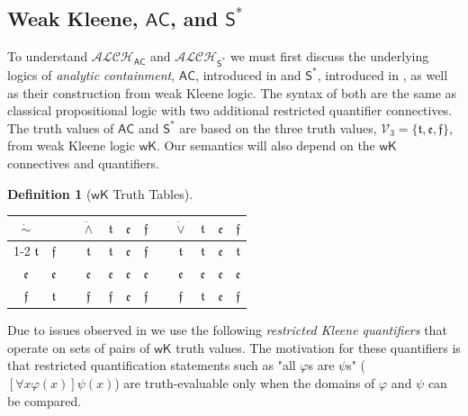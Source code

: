 \documentclass[letterpaper]{article} %
\theoremstyle{definition}
\theoremstyle{definition}
\newtheorem{definition}{Definition}
\theoremstyle{definition}
\theoremstyle{definition}
\theoremstyle{definition}
\newcommand{\strongneg}{\mathord{\sim}}
\newcommand{\vt}{\mathfrak{t}}
\newcommand{\vf}{\mathfrak{f}}
\newcommand{\vu}{\mathfrak{e}}
\begin{document}
\subsection{Weak Kleene, $\mathsf{AC}$, and $\mathsf{S}^*$}
To understand $\mathcal{ALCH}_\mathsf{AC}$ and $\mathcal{ALCH}_{\mathsf{S}^*}$ we must first discuss the underlying logics of \textit{analytic containment}, $\mathsf{AC}$, introduced in \cite{Angell1977-ANGTSO-9} and $\mathsf{S}^*$, introduced in \cite{Daniels1990-DANANO-3}, as well as their construction from weak Kleene logic. The syntax of both are the same as classical propositional logic with two additional restricted quantifier connectives. The truth values of $\mathsf{AC}$ and $\mathsf{S}^*$ are based on the three truth values, $\mathcal{V}_3 = \{\vt, \vu, \vf\}$, from weak Kleene logic $\mathsf{wK}$. Our semantics will also depend on the $\mathsf{wK}$ connectives and quantifiers.  
\begin{definition}[$\mathsf{wK}$ Truth Tables]
\leavevmode\par\noindent
\begin{tabular}{c|c c c|ccc c c|ccc}
    $\dot{\strongneg}$ & && $\dot{\wedge}$ & $\vt$ & $\vu$ & $\vf$ && $\dot{\vee}$ & $\vt$ & $\vu$ & $\vf$\\
    \cline{1-2}\cline{4-7}\cline{9-12}
    $\vt$ & $\vf$ && $\vt$ & $\vt$ & $\vu$ & $\vf$ && $\vt$ & $\vt$ & $\vu$ & $\vt$\\
    $\vu$ & $\vu$ && $\vu$ & $\vu$ & $\vu$ & $\vu$ && $\vu$ & $\vu$ & $\vu$ & $\vu$\\
    $\vf$ & $\vt$ && $\vf$ & $\vf$ & $\vu$ & $\vf$ && $\vf$ & $\vt$ & $\vu$ & $\vf$\\
\end{tabular}
\end{definition}
\noindent Due to issues observed in \cite{DBLP:conf/tableaux/Ferguson21,DBLP:conf/dlog/Ferguson21} we use the following \textit{restricted Kleene quantifiers} that operate on sets of pairs of $\mathsf{wK}$ truth values. The motivation for these quantifiers is that restricted quantification statements such as "all $\varphi$s are $\psi$s" ($[\forall x\varphi(x)]\psi(x)$) are truth-evaluable only when the domains of $\varphi$ and $\psi$ can be compared.
\end{document}
